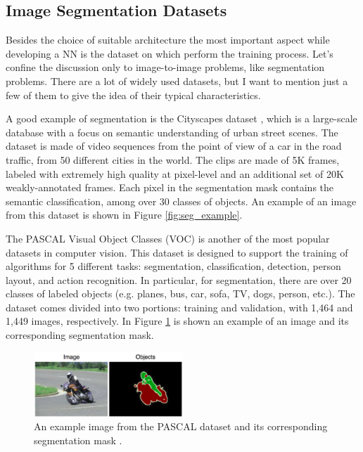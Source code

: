 \subsection{Image Segmentation Datasets}
Besides the choice of suitable architecture the most important aspect while developing a NN is the dataset on which perform the training process. Let's confine the discussion only to image-to-image problems, like segmentation problems. There are a lot of widely used datasets, but I want to mention just a few of them to give the idea of their typical characteristics.

A good example of segmentation is the Cityscapes dataset \cite{Cityscapes}, which is a large-scale database with a focus on semantic understanding of urban street scenes. The dataset is made of video sequences from the point of view of a car in the road traffic, from 50 different cities in the world. The clips are made of 5K frames, labeled with extremely high quality at pixel-level and an additional set of 20K weakly-annotated frames. Each pixel in the segmentation mask contains the semantic classification, among over 30 classes of objects. An example of an image from this dataset is shown in Figure \ref{fig:seg_example}.

The PASCAL Visual Object Classes (VOC) \cite{PASCAL} is another of the most popular datasets in computer vision. This dataset is designed to support the training of algorithms for 5 different tasks: segmentation, classification, detection, person layout, and action recognition. In particular, for segmentation, there are over 20 classes of labeled objects (e.g. planes, bus, car, sofa, TV, dogs, person, etc.). The dataset comes divided into two portions: training and validation, with 1,464 and 1,449 images, respectively. In Figure \ref{fig:PASCAL} is shown an example of an image and its corresponding segmentation mask.

    \begin{figure}
        \centering
        \includegraphics[width = 0.5\textwidth]{images/PASCAL}
        \caption{An example image from the PASCAL dataset and its corresponding segmentation mask \cite{PASCAL}.}
        \label{fig:PASCAL}
    \end{figure}

